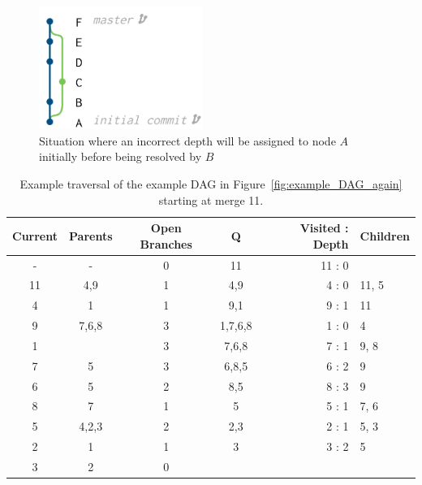 \begin{figure}[htpb]
  \centering
  \includegraphics[height=4cm]{Figures/graph_1.png}
  \caption{Situation where an incorrect depth will be assigned to node
    $A$ initially before being resolved by $B$}
  \label{fig:graph_1}
\end{figure}

\begin{table}[htpb]
  \centering
  \caption{Example traversal of the example DAG in
    Figure~\ref{fig:example_DAG_again} starting at merge 11.}
  \label{tab:ex_traversal}
  \begin{tabular}{cccc|rl}
    \toprule
    Current & Parents & Open Branches & Q       & Visited : Depth & Children\\\midrule
    -       & -       & 0             & 11      & 11      : 0     & \\
    11      & 4,9     & 1             & 4,9     & 4       : 0     & 11, 5\\
    4       & 1       & 1             & 9,1     & 9       : 1     & 11\\
    9       & 7,6,8   & 3             & 1,7,6,8 & 1       : 0     & 4\\
    1       &         & 3             & 7,6,8   & 7       : 1     & 9, 8\\
    7       & 5       & 3             & 6,8,5   & 6       : 2     & 9\\
    6       & 5       & 2             & 8,5     & 8       : 3     & 9\\
    8       & 7       & 1             & 5       & 5       : 1     & 7, 6\\
    5       & 4,2,3   & 2             & 2,3     & 2       : 1     & 5, 3\\
    2       & 1       & 1             & 3       & 3       : 2     & 5\\
    3       & 2       & 0             &         &                 & \\
    \bottomrule
  \end{tabular}
\end{table}

